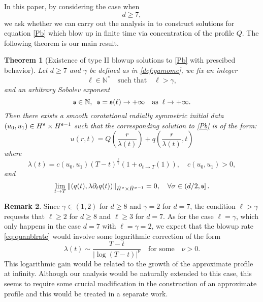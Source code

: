 \documentclass[11pt]{aims}
\newtheorem{theorem}{Theorem}[section]
\theoremstyle{definition}
\newtheorem{remark}[theorem]{Remark}
\numberwithin{equation}{section}
\begin{document}
\bigskip

In this paper, by considering the case when 
$$d \geq 7,$$
we ask whether we can carry out the analysis in \cite{IGN16} to construct solutions for equation \eqref{Pb} which blow up in finite time via concentration of the profile $Q$. The following theorem is our main result. 
\begin{theorem}[Existence of type II blowup solutions to \eqref{Pb} with prescibed behavior] \label{Theo:1} Let $d \geq 7$ and $\gamma$ be defined as in \eqref{def:gamome}, we fix an integer 
$$\ell \in \mathbb{N}^* \quad  \text{such that}\quad \ell > \gamma,$$
and an arbitrary Sobolev exponent
$$\frak{s} \in \mathbb{N},\;\; \frak{s} = \frak{s}(\ell) \to +\infty \quad \text{as}\;\; \ell \to +\infty.$$
Then there exists a smooth corotational radially symmetric initial data $(u_0,u_1) \in H^\frak{s} \times H^{\frak{s} - 1}$ such that the corresponding solution to \eqref{Pb} is of the form:
\begin{equation}\label{eq:uQq}
u(r,t) = Q\left(\frac{r}{\lambda(t)}\right) + q\left(\frac{r}{\lambda(t)}, t\right)
\end{equation}
where 
\begin{equation}\label{eq:quanblrate}
\lambda(t) = c(u_0, u_1)(T-t)^\frac{\ell}{\gamma} (1 + o_{t \to T}(1)), \quad c(u_0,u_1) > 0,
\end{equation}
and 
\begin{equation}\label{eq:asypqs}
\lim_{t \to T}\|(q(t), \lambda {\partial_t} q(t))\|_{\dot H^\sigma \times \dot H^{\sigma-1}} = 0, \quad \forall \sigma \in \left(d/2, \frak{s}\right].
\end{equation}
\end{theorem}

\begin{remark} Since  $\gamma \in (1, 2)$ for $d \geq 8$ and $\gamma = 2$ for $d = 7$, the condition $\ell > \gamma$ requests that $\ell \geq 2$ for $d \geq 8$ and $\ell \geq 3$ for $d = 7$. As for the case $\ell = \gamma$, which only happens in the case $d = 7$ with $\ell = \gamma = 2$, we expect that the blowup rate  \eqref{eq:quanblrate} would involve some logarithmic correction of the form
$$\lambda(t) \sim \frac{T-t}{|\log(T-t)|^\nu} \quad \text{for some} \quad \nu > 0.$$ 
This logarithmic gain would be related to the growth of the approximate profile at infinity. Although our analysis would be naturally extended  to this case, this seems to require some crucial modification in the construction of an approximate profile and this would be treated in a separate work. 
\end{remark}
\end{document}
